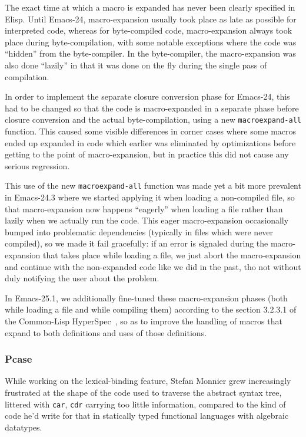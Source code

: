\documentclass[format=acmsmall, review=false, screen=true]{acmart}
\newcommand \Elisp {Elisp}
\begin{document}
The exact time at which a macro is expanded has never been clearly specified
in \Elisp{}.  Until Emacs-24, macro-expansion usually took place as late as
possible for interpreted code, whereas for byte-compiled code,
macro-expansion always took place during byte-compilation, with some notable
exceptions where the code was ``hidden'' from the byte-compiler.  In the
byte-compiler, the macro-expansion was also done ``lazily'' in that it was
done on the fly during the single pass of compilation.

In order to implement the separate closure conversion phase for Emacs-24,
this had to be changed so that the code is macro-expanded in a separate
phase before closure conversion and the actual byte-compilation, using a new
\texttt{macroexpand-all} function.
This caused some visible differences in corner cases where some macros ended
up expanded in code which earlier was eliminated by optimizations before
getting to the point of macro-expansion, but in practice this did not cause
any serious regression.

This use of the new \texttt{macroexpand-all} function was made yet a bit
more prevalent in Emacs-24.3 where we started applying it when loading
a non-compiled file, so that macro-expansion now happens ``eagerly'' when
loading a file rather than lazily when we actually run the code.  This eager
macro-expansion occasionally bumped into problematic dependencies (typically
in files which were never compiled), so we made it fail gracefully: if an
error is signaled during the macro-expansion that takes place while loading
a file, we just abort the macro-expansion and continue with the non-expanded
code like we did in the past, tho not without duly notifying the user about
the problem.

In Emacs-25.1, we additionally fine-tuned these macro-expansion phases (both
while loading a file and while compiling them) according to the section
3.2.3.1 of the Common-Lisp HyperSpec~\cite{HyperSpec}, so as to improve the
handling of macros that expand to both definitions and uses of
those definitions.

\subsubsection{Pcase}           %

While working on the lexical-binding feature, Stefan Monnier grew
increasingly frustrated at the shape of the code used to traverse the
abstract syntax tree, littered with \texttt{car}, \texttt{cdr} carrying too
little information, compared to the kind of code he'd write for that in
statically typed functional languages with algebraic datatypes.
\end{document}
